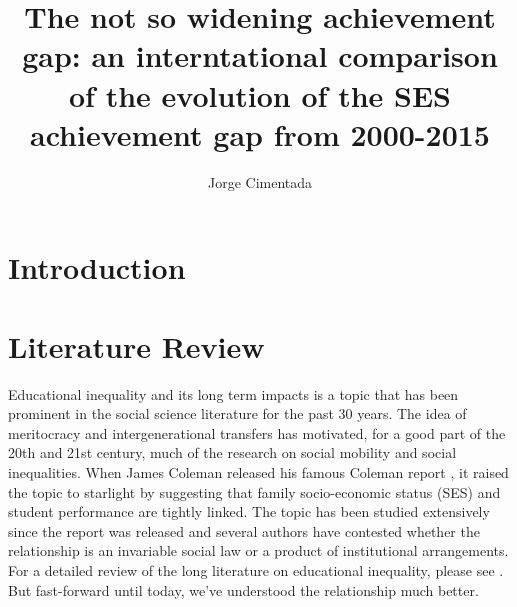 \documentclass[11pt, a4paper]{article}\usepackage[]{graphicx}\usepackage[]{color}
\title{The not so widening achievement gap: an interntational comparison of the evolution of the SES achievement gap from 2000-2015}
\author{Jorge Cimentada}
\begin{document}
\setlength{\parindent}{2em}
\setlength{\parskip}{1em}

\maketitle





\tableofcontents












\section{Introduction}

\section{Literature Review}
Educational inequality and its long term impacts is a topic that has been prominent in the social science literature for the past 30 years. The idea of meritocracy and intergenerational transfers has motivated, for a good part of the 20th and 21st century, much of the research on social mobility and social inequalities. When James Coleman released his famous Coleman report \citep{coleman1966}, it raised the topic to starlight by suggesting that family socio-economic status (SES) and student performance are tightly linked. The topic has been studied extensively since the report was released and several authors have contested whether the relationship is an invariable social law or a product of institutional arrangements. For a detailed review of the long literature on educational inequality, please see \citet{gamoran2001}. But fast-forward until today, we've understood the relationship much better.
\end{document}
